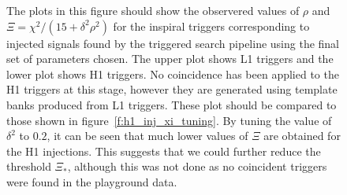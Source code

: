 \begin{figure}[p]
{\label{f:h1_inj_xi_final}
The plots in this figure should show the observered values of $\rho$ and $\Xi
= \chi^2/(15 + \delta^2\rho^2)$ for the inspiral triggers corresponding to
injected signals found by the triggered search pipeline using the final set of
parameters chosen. The upper plot shows L1 triggers and the lower plot shows
H1 triggers. No coincidence has been applied to the H1 triggers at this stage,
however they are generated using template banks produced from L1 triggers.
These plot should be compared to those shown in
figure~\ref{f:h1_inj_xi_tuning}. By tuning the value of $\delta^2$ to $0.2$,
it can be seen that much lower values of $\Xi$ are obtained for the H1
injections. This suggests that we could further reduce the threshold
$\Xi_\ast$, although this was not done as no coincident triggers were found in
the playground data.
}
\end{figure}

